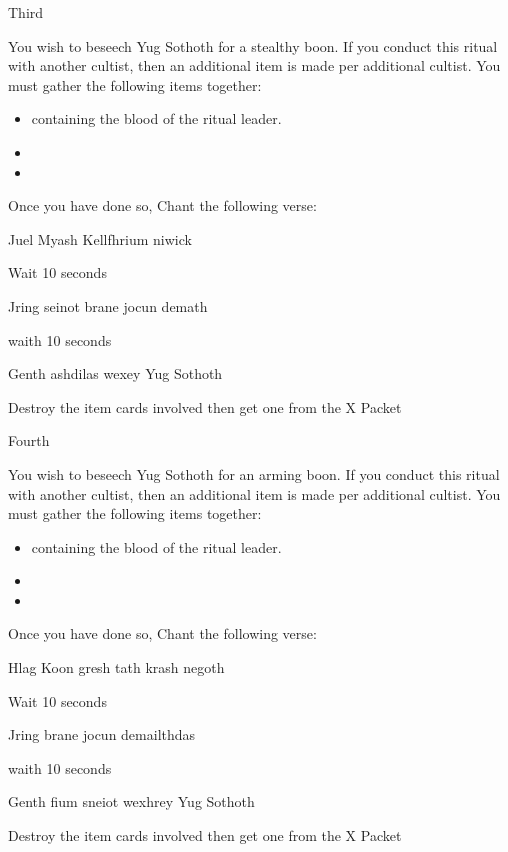 \documentclass[greennotebook]{guildcamp4} %
\begin{document}
	\begin{page}{Third}
		
		You wish to beseech Yug Sothoth for a stealthy boon. If you conduct this ritual with another cultist, then an additional item is made per additional cultist. You must gather the following items together: 
		
		\begin{itemize}
			\item \iTestTube{} containing the blood of the ritual leader.
			\item \iGlassLens{}
			\item \iCauldron{}
		\end{itemize}		
		
		Once you have done so, Chant the following verse:
		
		Juel Myash Kellfhrium niwick
		
		Wait 10 seconds
		
		Jring seinot brane jocun demath
		
		waith 10 seconds
		
		Genth ashdilas wexey Yug Sothoth
		
		Destroy the item cards involved then get one \iInvisibilityCloak{} from the X Packet
		
	\end{page}
	
	\begin{page}{Fourth}
		
		You wish to beseech Yug Sothoth for an arming boon. If you conduct this ritual with another cultist, then an additional item is made per additional cultist. You must gather the following items together: 
		
		\begin{itemize}
			\item \iTestTube{} containing the blood of the ritual leader.
			\item \iMultitool{}
			\item \iScrapMetal{}
		\end{itemize}		
		
		Once you have done so, Chant the following verse:
		
		Hlag Koon gresh tath krash negoth
		
		Wait 10 seconds
		
		Jring  brane jocun demailthdas
		
		waith 10 seconds
		
		Genth fium sneiot wexhrey Yug Sothoth
		
		Destroy the item cards involved then get one \iCRUpPotion{} from the X Packet
		
		
	\end{page}
	
\end{document}
